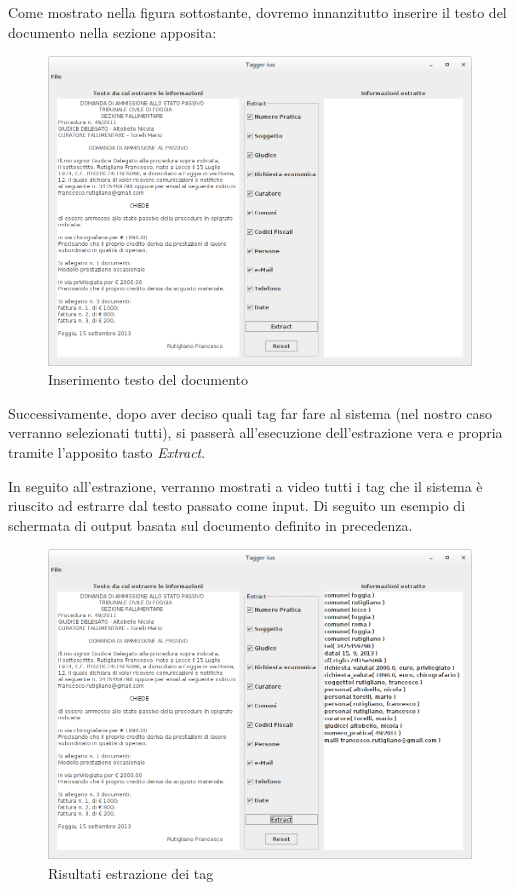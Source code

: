 Come mostrato nella figura sottostante, dovremo innanzitutto inserire il testo del documento nella sezione apposita:
\begin{figure}[H]
	\centering
	\includegraphics[width=1.1\textwidth]{img/interfaces/java-document.png}
	\caption[[Schermata java document]{Inserimento testo del documento}
	\label{java-doc}
\end{figure}

Successivamente, dopo aver deciso quali tag far fare al sistema (nel nostro caso verranno selezionati tutti), si passerà all'esecuzione dell'estrazione vera e propria tramite l'apposito tasto \emph{Extract}.

In seguito all'estrazione, verranno mostrati a video tutti i tag che il sistema è riuscito ad estrarre dal testo passato come input. Di seguito un esempio di schermata di output basata sul documento definito in precedenza.

\begin{figure}[H]
	\centering
	\includegraphics[width=1.1\textwidth]{img/interfaces/java-result.png}
	\caption[Schermata java result]{Risultati estrazione dei tag}
	\label{java-result}
\end{figure}

